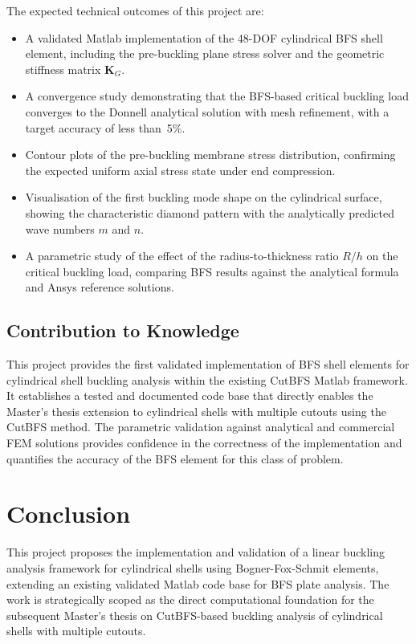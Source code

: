 \documentclass[9pt,a4paper,twoside]{tau-class/tau}
\begin{document}
The expected technical outcomes of this project are:
%
\begin{itemize}
    \item A validated Matlab implementation of the 48-DOF cylindrical BFS
          shell element, including the pre-buckling plane stress solver and
          the geometric stiffness matrix $\mathbf{K}_G$.
    \item A convergence study demonstrating that the BFS-based critical
          buckling load converges to the Donnell analytical solution with
          mesh refinement, with a target accuracy of less than~5\%.
    \item Contour plots of the pre-buckling membrane stress distribution,
          confirming the expected uniform axial stress state under end
          compression.
    \item Visualisation of the first buckling mode shape on the cylindrical
          surface, showing the characteristic diamond pattern with the
          analytically predicted wave numbers $m$ and $n$.
    \item A parametric study of the effect of the radius-to-thickness ratio
          $R/h$ on the critical buckling load, comparing BFS results
          against the analytical formula and Ansys reference solutions.
\end{itemize}

\subsection{Contribution to Knowledge}

This project provides the first validated implementation of BFS shell
elements for cylindrical shell buckling analysis within the existing CutBFS
Matlab framework. It establishes a tested and documented code base that
directly enables the Master's thesis extension to cylindrical shells with
multiple cutouts using the CutBFS method. The parametric validation against
analytical and commercial FEM solutions provides confidence in the
correctness of the implementation and quantifies the accuracy of the BFS
element for this class of problem.

\section{Conclusion}

This project proposes the implementation and validation of a linear buckling
analysis framework for cylindrical shells using Bogner-Fox-Schmit elements,
extending an existing validated Matlab code base for BFS plate analysis. The
work is strategically scoped as the direct computational foundation for the
subsequent Master's thesis on CutBFS-based buckling analysis of cylindrical
shells with multiple cutouts.
\end{document}
